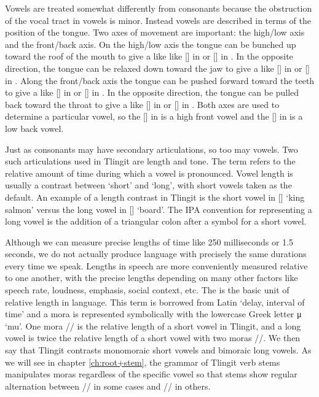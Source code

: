 Vowels are treated somewhat differently from consonants because the obstruction of the vocal tract in vowels is minor.
Instead vowels are described in terms of the position of the tongue.
Two axes of movement are important: the high/low axis and the front/back axis.
On the high/low axis the tongue can be bunched up toward the roof of the mouth to give a  like like [] in  or [] in . In the opposite direction, the tongue can be relaxed down toward the jaw to give a  like [] in  or [] in .
Along the front/back axis the tongue can be pushed forward toward the teeth to give a  like [] in  or [] in .
In the opposite direction, the tongue can be pulled back toward the throat to give a  like [] in  or [] in .
Both axes are used to determine a particular vowel, so the [] in  is a high front vowel and the [] in  is a low back vowel.

Just as consonants may have secondary articulations, so too may vowels.
Two such articulations used in Tlingit are length and tone.
The term  refers to the relative amount of time during which a vowel is pronounced.
Vowel length is usually a contrast between ‘short’ and ‘long’, with short vowels taken as the default.
An example of a length contrast in Tlingit is the short vowel in  [] ‘king salmon’ versus the long vowel in  [] ‘board’.
The IPA convention for representing a long vowel is the addition of a triangular colon  after a symbol for a short vowel.

Although we can measure precise lengths of time like 250 milliseconds or 1.5 seconds, we do not actually produce language with precisely the same durations every time we speak.
Lengths in speech are more conveniently measured relative to one another, with the precise lengths depending on many other factors like speech rate, loudness, emphasis, social context, etc.
The  is the basic unit of relative length in language.
This term is borrowed from Latin  ‘delay, interval of time’ and a mora is represented symbolically with the lowercase Greek letter μ ‘mu’.
One mora // is the relative length of a short vowel in Tlingit, and a long vowel is twice the relative length of a short vowel with two moras //.
We then say that Tlingit contrasts monomoraic short vowels and bimoraic long vowels.
As we will see in chapter \ref{ch:root+stem}, the grammar of Tlingit verb stems manipulates moras regardless of the specific vowel so that stems show regular alternation between // in some cases and // in others.

